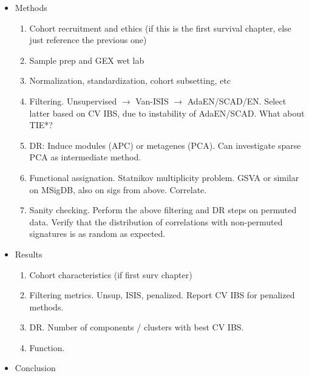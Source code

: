 \documentclass[thesis.tex]{subfiles}
\begin{document}
\begin{itemize}
  \item Methods
  \begin{enumerate}
    \item Cohort recruitment and ethics (if this is the first survival chapter, else just reference the previous one)
    \item Sample prep and GEX wet lab
    \item Normalization, standardization, cohort subsetting, etc
    \item Filtering.  Unsupervised $\rightarrow$ Van-ISIS $\rightarrow$ AdaEN/SCAD/EN.  Select latter based on CV IBS, due to instability of AdaEN/SCAD.  What about TIE*?
    \item DR: Induce modules (APC) or metagenes (PCA).  Can investigate sparse PCA as intermediate method.
    \item Functional assignation.  Statnikov multiplicity problem.  GSVA or similar on MSigDB, also on sigs from above.  Correlate.
    \item Sanity checking.  Perform the above filtering and DR steps on permuted data.  Verify that the distribution of correlations with non-permuted signatures is as random as expected.
  \end{enumerate}
  
  \item Results
  \begin{enumerate}
    \item Cohort characteristics (if first surv chapter)
    \item Filtering metrics.  Unsup, ISIS, penalized.  Report CV IBS for penalized methods.
    \item DR.  Number of components / clusters with best CV IBS.
    \item Function.
  \end{enumerate}

  \item Conclusion
  
\end{itemize}
\end{document}
